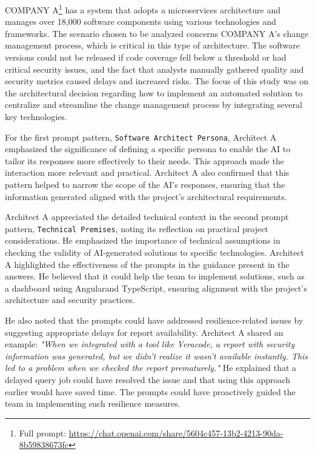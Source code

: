 \documentclass[runningheads]{llncs}
\begin{document}
COMPANY A\footnote{Full prompt: \url{https://chat.openai.com/share/5604c457-13b2-4213-90da-8b59838673fc}} has a system that adopts a microservices architecture and manages over 18,000 software components using various technologies and frameworks. 
The scenario chosen to be analyzed concerns COMPANY A's change management process, which is critical in this type of architecture. The software versions could not be released if code coverage fell below a threshold or had critical security issues, and the fact that analysts manually gathered quality and security metrics caused delays and increased risks. The focus of this study was on the architectural decision regarding how to implement an automated solution to centralize and streamline the change management process by integrating several key technologies. 


For the first prompt pattern, \texttt{Software Architect Persona}, Architect A emphasized the significance of defining a specific persona to enable the AI to tailor its responses more effectively to their needs. This approach made the interaction more relevant and practical. Architect A also confirmed that this pattern helped to narrow the scope of the AI's responses, ensuring that the information generated aligned with the project’s architectural requirements. 

Architect A appreciated the detailed technical context in the second prompt pattern, \texttt{Technical Premises}, noting its reflection on practical project considerations. He emphasized the importance of technical assumptions in checking the validity of AI-generated solutions to specific technologies. Architect A highlighted the effectiveness of the prompts in the guidance present in the answers. He believed that it could help the team to implement solutions, such as a dashboard using Angularand TypeScript, ensuring alignment with the project's architecture and security practices.

He also noted that the prompts could have addressed resilience-related issues by suggesting appropriate delays for report availability. Architect A shared an example: \textit{"When we integrated with a tool like Veracode, a report with security information was generated, but we didn’t realize it wasn’t available instantly. This led to a problem when we checked the report prematurely."} He explained that a delayed query job could have resolved the issue and that using this approach earlier would have saved time. The prompts could have proactively guided the team in implementing such resilience measures.
\end{document}
